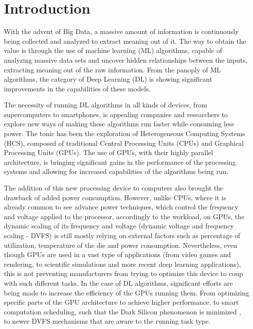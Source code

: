 
\chapter{Introduction}
\label{chapter:introduction}

With the advent of Big Data, a massive amount of information is continuously being collected and analyzed to extract meaning out of it. The way to obtain the value is through the use of machine learning (ML) algorithms, capable of analyzing massive data sets and uncover hidden relationships between the inputs, extracting meaning out of the raw information. From the panoply of ML algorithms, the category of Deep Learning (DL) is showing significant improvements in the capabilities of these models. 

The necessity of running DL algorithms in all kinds of devices, from supercomputers to smartphones, is appealing companies and researchers to explore new ways of making these algorithms run faster while consuming less power. The tonic has been the exploration of Heterogeneous Computing Systems (HCS), composed of traditional Central Processing Units (CPUs) and Graphical Processing Units (GPUs). The use of GPUs, with their highly parallel architecture, is bringing significant gains in the performance of the processing systems and allowing for increased capabilities of the algorithms being run. 

The addition of this new processing device to computers also brought the drawback of added power consumption. However, unlike CPUs, where it is already common to see advance power techniques, which control the frequency and voltage applied to the processor, accordingly to the workload, on GPUs, the dynamic scaling of its frequency and voltage (dynamic voltage and frequency scaling - DVFS) is still mostly relying on external factors such as percentage of utilization, temperature of the die and power consumption. Nevertheless, even though GPUs are used in a vast type of applications (from video games and rendering, to scientific simulations and more recent deep learning applications), this is not preventing manufacturers from trying to optimize this device to coup with such different tasks. In the case of DL algorithms, significant efforts are being made to increase the efficiency of the GPUs running them. From optimizing specific parts of the GPU architecture to achieve higher performance, to smart computation scheduling, such that the Dark Silicon phenomenon is minimized \cite{esmaeilzadeh_dark_2011}, to newer DVFS mechanisms that are aware to the running task type. 

